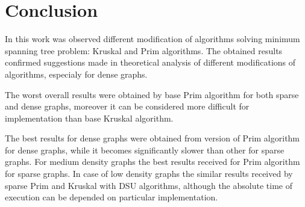 \section*{Conclusion}

In this work was observed different modification of algorithms solving minimum spanning tree problem: Kruskal and Prim algorithms.
The obtained results confirmed suggestions made in theoretical analysis of different modifications of algorithms, especialy for dense graphs.

The worst overall results were obtained by base Prim algorithm for both sparse and dense graphs, moreover it can be considered more difficult for implementation than base
Kruskal algorithm.

The best results for dense graphs were obtained from version of Prim algorithm for dense graphs, while it becomes significantly slower than other for sparse graphs.
For medium density graphs the best results received for Prim algorithm for sparse graphs.
In case of low density graphs the similar results received by sparse Prim and Kruskal with DSU algorithms, although the absolute time of execution can be depended on particular implementation.